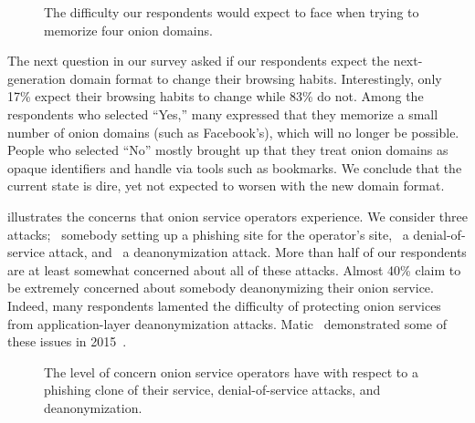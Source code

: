 \begin{figure}[t]
    \centering
    
    \caption{The difficulty our respondents would expect to face when trying to
    memorize four onion domains.}
    \label{fig:memorize-domains}
\end{figure}

The next question in our survey asked if our respondents expect the
next-generation domain format to change their browsing habits.  Interestingly,
only 17\% expect their browsing habits to change while 83\% do not.  Among the
respondents who selected ``Yes,'' many expressed that they memorize a small
number of onion domains (such as Facebook's), which will no longer be possible.
People who selected ``No'' mostly brought up that they treat onion domains as
opaque identifiers and handle via tools such as bookmarks.  We conclude that the
current state is dire, yet not expected to worsen with the new domain format.

 illustrates the concerns that onion service
operators experience.  We consider three attacks; \first~somebody setting up a
phishing site for the operator's site, \second~a denial-of-service attack, and
\third~a deanonymization attack.  More than half of our respondents are at least
somewhat concerned about all of these attacks.  Almost 40\% claim to be
extremely concerned about somebody deanonymizing their onion service.  Indeed,
many respondents lamented the difficulty of protecting onion services from
application-layer deanonymization attacks.  Matic \ea\ demonstrated some of
these issues in 2015~\cite{Matic2015a}.

\begin{figure}[t]
    \centering
    
    \caption{The level of concern onion service operators have with respect to a
    phishing clone of their service, denial-of-service attacks, and
    deanonymization.}
    \label{fig:onion-operation-concerns}
\end{figure}

